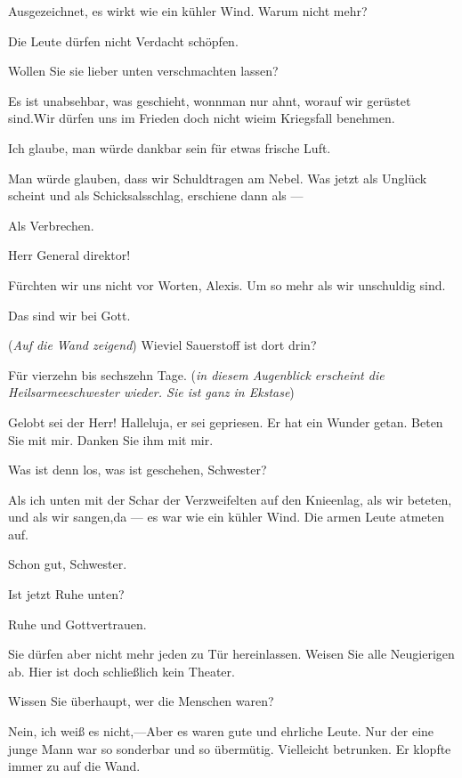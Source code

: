 \documentclass[
	final,
	a4paper,
	ngerman,
	mpinclude = true, %
	twoside = true,
	open = right,
	cleardoublepage = plain,
	DIV = 13,
	BCOR = 1cm,
	titlepage = firstiscover,
	]{scrbook}
\newcommand{\direction}[1]{(\textit{#1})}
\newcommand{\thecharacter}[1]{\textup{\textsc{#1}}\xspace}
\newcommand{\theAlexis}{\thecharacter{Alexis}}
\newcommand{\character}[1]{\item[#1]}
\newcommand{\Generaldirektor}{\character{Direktor}}
\newcommand{\Alexis}{\character{\theAlexis}}
\newcommand{\Heilsarmeeschwester}{\character{Schwester}}
\begin{document}
\begin{play}
\Generaldirektor
Ausgezeichnet, es wirkt wie ein kühler Wind. Warum nicht mehr?

\Alexis
Die Leute dürfen nicht Verdacht schöpfen.

\Generaldirektor
Wollen Sie sie lieber unten verschmachten lassen?

\Alexis
Es ist unabsehbar, was geschieht, wonnman nur ahnt, worauf wir gerüstet sind.Wir dürfen uns im Frieden doch nicht wieim Kriegsfall benehmen.

\Generaldirektor
Ich glaube, man würde dankbar sein für etwas frische Luft.

\Alexis
Man würde glauben, dass wir Schuldtragen am Nebel. Was jetzt als Unglück scheint und als Schicksalsschlag, erschiene dann als ---

\Generaldirektor
Als Verbrechen.

\Alexis
Herr General direktor!

\Generaldirektor
Fürchten wir uns nicht vor Worten, Alexis. Um so mehr als wir unschuldig sind.

\Alexis
Das sind wir bei Gott.

\Generaldirektor
\direction{Auf die Wand zeigend} Wieviel Sauerstoff ist dort drin?

\Alexis
Für vierzehn bis sechszehn Tage. \direction{in diesem Augenblick erscheint die Heilsarmeeschwester wieder. Sie ist ganz in Ekstase}

\Heilsarmeeschwester
Gelobt sei der Herr! Halleluja, er sei gepriesen. Er hat ein Wunder getan. Beten Sie mit mir. Danken Sie ihm mit mir.

\Generaldirektor
Was ist denn los, was ist geschehen, Schwester?

\Heilsarmeeschwester
Als ich unten mit der Schar der Verzweifelten auf den Knieenlag, als wir beteten, und als wir sangen,da --- es war wie ein kühler Wind. Die armen Leute atmeten auf.

\Generaldirektor
Schon gut, Schwester.

\Alexis
Ist jetzt Ruhe unten?

\Heilsarmeeschwester
Ruhe und Gottvertrauen.

\Alexis
Sie dürfen aber nicht mehr jeden zu Tür hereinlassen. Weisen Sie alle Neugierigen ab. Hier ist doch schließlich kein Theater.

\Generaldirektor
Wissen Sie überhaupt, wer die Menschen waren?

\Heilsarmeeschwester
Nein, ich weiß es nicht,---Aber es waren gute und ehrliche Leute. Nur der eine junge Mann war so sonderbar und so übermütig. Vielleicht betrunken. Er klopfte immer zu auf die Wand.


\end{play}
\end{document}
